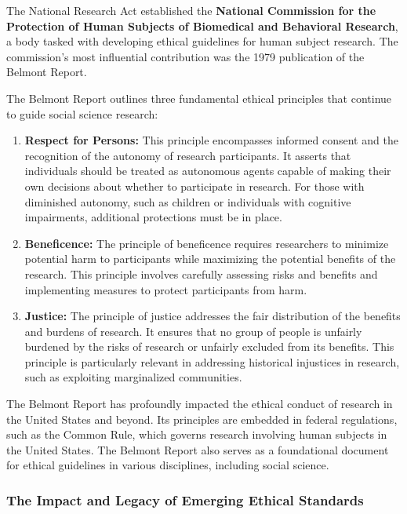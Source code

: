 \documentclass[
]{book}
\begin{document}
The National Research Act established the \textbf{National Commission for the Protection of Human Subjects of Biomedical and Behavioral Research}, a body tasked with developing ethical guidelines for human subject research. The commission's most influential contribution was the 1979 publication of the Belmont Report.

The Belmont Report outlines three fundamental ethical principles that continue to guide social science research:

\begin{enumerate}
\def\labelenumi{\arabic{enumi}.}
\item
  \textbf{Respect for Persons:} This principle encompasses informed consent and the recognition of the autonomy of research participants. It asserts that individuals should be treated as autonomous agents capable of making their own decisions about whether to participate in research. For those with diminished autonomy, such as children or individuals with cognitive impairments, additional protections must be in place.
\item
  \textbf{Beneficence:} The principle of beneficence requires researchers to minimize potential harm to participants while maximizing the potential benefits of the research. This principle involves carefully assessing risks and benefits and implementing measures to protect participants from harm.
\item
  \textbf{Justice:} The principle of justice addresses the fair distribution of the benefits and burdens of research. It ensures that no group of people is unfairly burdened by the risks of research or unfairly excluded from its benefits. This principle is particularly relevant in addressing historical injustices in research, such as exploiting marginalized communities.
\end{enumerate}

The Belmont Report has profoundly impacted the ethical conduct of research in the United States and beyond. Its principles are embedded in federal regulations, such as the Common Rule, which governs research involving human subjects in the United States. The Belmont Report also serves as a foundational document for ethical guidelines in various disciplines, including social science.

\subsubsection*{The Impact and Legacy of Emerging Ethical Standards}\label{the-impact-and-legacy-of-emerging-ethical-standards}
\end{document}
